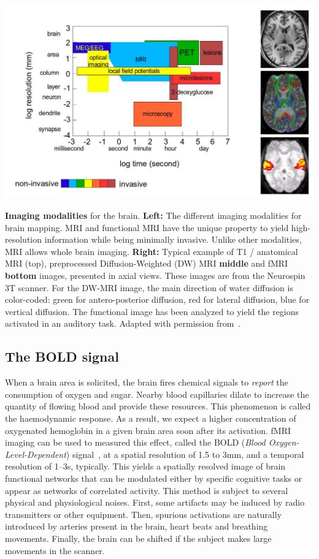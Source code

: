 \begin{pagefigure}%
  \includegraphics[width=1\linewidth]{figures/modalities.png}
  \caption{\textbf{Imaging modalities} for the brain. \textbf{Left:} The different imaging modalities for brain mapping.
      MRI and functional MRI have
the unique property to yield high-resolution information while being minimally invasive. Unlike other
modalities, MRI allows whole brain imaging. \textbf{Right:} Typical example of T1 / anatomical MRI (top), preprocessed Diffusion-Weighted (DW) MRI \textbf{middle} and fMRI \textbf{bottom} images, presented in axial views.
These images are from the Neurospin 3T scanner. For the DW-MRI image,
the main direction of water diffusion is color-coded: green for antero-posterior diffusion, red for lateral
diffusion, blue for vertical diffusion. The functional image has been analyzed to yield the regions activated
in an auditory task. Adapted with permission from~\citep{thirion_hdr}.}
\end{pagefigure}

\subsection{The BOLD signal}
When a brain area is solicited, the brain fires chemical signals to \textit{report}
the consumption of oxygen and sugar. Nearby blood capillaries dilate to increase the quantity
of flowing blood and provide these resources. This phenomenon is called the
haemodynamic response.
%
As a result, we expect a higher concentration of oxygenated hemoglobin
in a given brain area soon after its activation.
fMRI imaging can be used to measured this effect, called the BOLD (\textit{Blood Oxygen-Level-Dependent}) signal~\citep{agawa1990,ogawa1990b}, at a spatial resolution of 1.5 to 3mm, and a temporal resolution of 1--3s, typically. This yields a spatially resolved image of
brain functional networks that can be modulated
either by specific cognitive tasks or appear as
networks of correlated activity. This method is subject to several physical and physiological
noises. First,
some artifacts may be induced by radio transmitters or other equipment. Then,
spurious activations are naturally introduced by arteries present in
the brain, heart beats and breathing movements. Finally, the brain can be
shifted if the subject makes large movements in the scanner.

